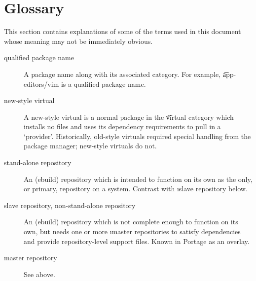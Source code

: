 \chapter{Glossary}
\label{sec:glossary}

This section contains explanations of some of the terms used in this document whose meaning may not
be immediately obvious.

\begin{description}
\item[qualified package name] A package name along with its associated category. For example,
    \t{app-editors/vim} is a qualified package name.
\item[new-style virtual] A new-style virtual is a normal package in the \t{virtual} category which
    installs no files and uses its dependency requirements to pull in a `provider'. Historically,
    old-style virtuals required special handling from the package manager; new-style virtuals do
    not.
\item[stand-alone repository] An (ebuild) repository which is intended to function on its own as the
    only, or primary, repository on a system. Contrast with \i{slave repository} below.
\item[slave repository, non-stand-alone repository] An (ebuild) repository which is not complete
    enough to function on its own, but needs one or more \i{master repositories} to
    satisfy dependencies and provide repository-level support files. Known in Portage as an overlay.
\item[master repository] See above.

\end{description}


